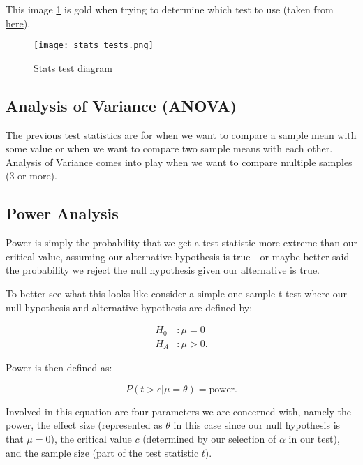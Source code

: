 This image \ref{fig:stats_tests_diagram} is gold when trying to determine which test to use (taken from \href{https://bloomingtontutors.com/blog/when-to-use-the-z-test-versus-t-test}{here}).


 \begin{figure} \label{fig:stats_tests_diagram}
\caption{Stats test diagram}
\centering
 \texttt{[image: stats\_tests.png]}
 \end{figure}


\subsection{Analysis of Variance (ANOVA)}

The previous test statistics are for when we want to compare a sample mean with some value or when we want to compare two sample means with each other. Analysis of Variance comes into play when we want to compare multiple samples (3 or more). 




\subsection{Power Analysis}

Power is simply the probability that we get a test statistic more extreme than our critical value, assuming our alternative hypothesis is true - or maybe better said the probability we reject the null hypothesis given our alternative is true. 

To better see what this looks like consider a simple one-sample t-test where our null hypothesis and alternative hypothesis are defined by:

\begin{equation}
\begin{split}
H_0 &: \mu = 0 \\
H_A &:  \mu > 0.
\end{split}
\end{equation}

\noindent Power is then defined as:

\begin{equation}
P(t > c | \mu = \theta) = \text{power}.
\end{equation}

Involved in this equation are four parameters we are concerned with, namely the power, the effect size (represented as $\theta$ in this case since our null hypothesis is that $\mu=0$), the critical value $c$ (determined by our selection of $\alpha$ in our test), and the sample size (part of the test statistic $t$). 

